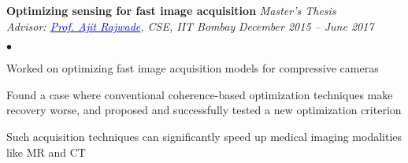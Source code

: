 \documentclass[margin,line]{res}
\newenvironment{list2}{
  \begin{list}{$\bullet$}{%
      \setlength{\itemsep}{0in}
      \setlength{\parsep}{0in} \setlength{\parskip}{0in}
      \setlength{\topsep}{0in} \setlength{\partopsep}{0in} 
      \setlength{\leftmargin}{0.18in}}}{\end{list}}
\begin{document}
\begin{resume}
{\bf Optimizing sensing for fast image acquisition} \hfill \textit{Master's Thesis} \\
{\em Advisor: \href{https://www.cse.iitb.ac.in/~ajitvr}{\textcolor{blue}{Prof. Ajit Rajwade}}, CSE, IIT Bombay} \hfill {\it December 2015 -- June 2017} \\
\vspace*{-.13in}
\begin{list2}
\item Worked on optimizing fast image acquisition models for compressive cameras
\item Found a case where conventional coherence-based optimization techniques make recovery worse, and proposed and successfully tested a new optimization criterion
\item Such acquisition techniques can significantly speed up medical imaging modalities like MR and CT

\end{list2}




\end{resume}
\end{document}
